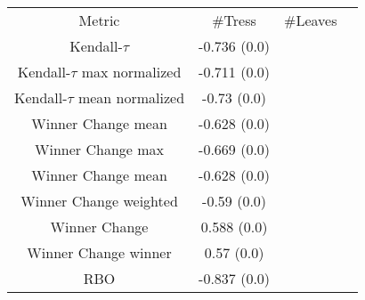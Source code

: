 \begin{tabular}{c|c|c|c} 
Metric & #Tress & #Leaves \\ 
Kendall-$\tau$ & -0.736 (0.0)   \\ 
Kendall-$\tau$ max normalized & -0.711 (0.0)  \\ 
Kendall-$\tau$ mean normalized & -0.73 (0.0)  \\ 
Winner Change mean& -0.628 (0.0) &  \\ 
Winner Change max & -0.669 (0.0) \\ 
Winner Change mean & -0.628 (0.0) &  \\ 
Winner Change weighted & -0.59 (0.0) \\ 
Winner Change & 0.588 (0.0) \\ 
Winner Change winner & 0.57 (0.0)  \\ 
RBO & -0.837 (0.0) \\ 
\end{tabular}